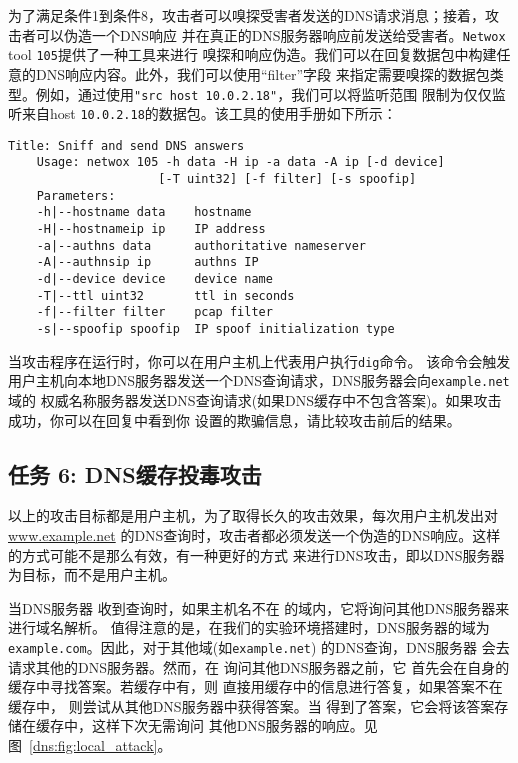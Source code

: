 为了满足条件1到条件8，攻击者可以嗅探受害者发送的DNS请求消息；接着，攻击者可以伪造一个DNS响应
并在真正的DNS服务器响应前发送给受害者。{\tt Netwox} tool \texttt{105}提供了一种工具来进行
嗅探和响应伪造。我们可以在回复数据包中构建任意的DNS响应内容。此外，我们可以使用``filter''字段
来指定需要嗅探的数据包类型。例如，通过使用\texttt{"src host 10.0.2.18"}，我们可以将监听范围
限制为仅仅监听来自host \texttt{10.0.2.18}的数据包。该工具的使用手册如下所示：

\begin{lstlisting}[caption={The usage of the Netwox Tool 105}]
Title: Sniff and send DNS answers
    Usage: netwox 105 -h data -H ip -a data -A ip [-d device]
                     [-T uint32] [-f filter] [-s spoofip]
    Parameters:
    -h|--hostname data    hostname
    -H|--hostnameip ip    IP address
    -a|--authns data      authoritative nameserver
    -A|--authnsip ip      authns IP
    -d|--device device    device name
    -T|--ttl uint32       ttl in seconds
    -f|--filter filter    pcap filter
    -s|--spoofip spoofip  IP spoof initialization type
\end{lstlisting}


当攻击程序在运行时，你可以在用户主机上代表用户执行\texttt{dig}命令。
该命令会触发用户主机向本地DNS服务器发送一个DNS查询请求，DNS服务器会向\texttt{example.net}域的
权威名称服务器发送DNS查询请求(如果DNS缓存中不包含答案)。如果攻击成功，你可以在回复中看到你
设置的欺骗信息，请比较攻击前后的结果。




\subsection{任务 6: DNS缓存投毒攻击}

以上的攻击目标都是用户主机，为了取得长久的攻击效果，每次用户主机发出对\url{www.example.net}
的DNS查询时，攻击者都必须发送一个伪造的DNS响应。这样的方式可能不是那么有效，有一种更好的方式
来进行DNS攻击，即以DNS服务器为目标，而不是用户主机。

当DNS服务器 \apollo 收到查询时，如果主机名不在 \apollo 的域内，它将询问其他DNS服务器来进行域名解析。
值得注意的是，在我们的实验环境搭建时，DNS服务器的域为{\tt example.com}。因此，对于其他域(如\texttt{example.net})
的DNS查询，DNS服务器 \apollo 会去请求其他的DNS服务器。然而，在 \apollo 询问其他DNS服务器之前，它
首先会在自身的缓存中寻找答案。若缓存中有，则 \apollo 直接用缓存中的信息进行答复，如果答案不在缓存中，
则尝试从其他DNS服务器中获得答案。当 \apollo 得到了答案，它会将该答案存储在缓存中，这样下次无需询问
其他DNS服务器的响应。见 图~\ref{dns:fig:local_attack}。


